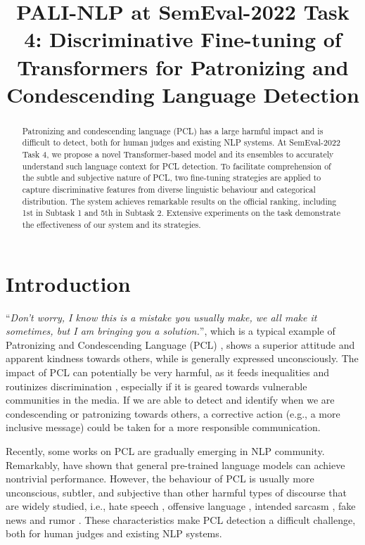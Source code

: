 \documentclass[11pt]{article}
\title{PALI-NLP at SemEval-2022 Task 4: Discriminative Fine-tuning of Transformers for Patronizing and Condescending Language Detection}
\author{Dou Hu 
\and Mengyuan Zhou 
        \and Xiyang Du
        \and Mengfei Yuan
        \\
        {\bf
        \and Meizhi Jin
        \and Lianxin Jiang
        \and Yang Mo
        \and Xiaofeng Shi
        } \\
        Ping An Life Insurance Company of China, Ltd. \\
\texttt{\{HUDOU470, ZHOUMENGYUAN425, DUXIYANG037, YUANMENGFEI854, } \\
        \texttt{JINMEIZHI005, JIANGLIANXIN769, MOYANG853, SHIXIAOFENG309\}} \\
        \texttt{@pingan.com.cn} \\
}
\begin{document}
\maketitle
\begin{abstract}
Patronizing and condescending language (PCL) has a large harmful impact and is difficult to detect, both for human judges and existing NLP systems.
At SemEval-2022 Task 4, we propose a novel Transformer-based model and its ensembles to accurately understand such language context for PCL detection.
To facilitate comprehension of the subtle and subjective nature of PCL, two fine-tuning strategies are applied to capture discriminative features from diverse linguistic behaviour and categorical distribution. 
The system achieves remarkable results on the official ranking, including 1st in Subtask 1 and 5th in Subtask 2.
Extensive experiments on the task demonstrate the effectiveness of our system and its strategies.
\end{abstract}

\section{Introduction}
“\textit{Don’t worry, I know this is a mistake you usually make, we all make it sometimes, but I am bringing you a solution.}”, which is a typical example of Patronizing and Condescending Language (PCL) \citep{giles1993patronizing,huckin2002critical}, shows a superior attitude and apparent kindness towards others, while is generally expressed unconsciously. The impact of PCL can potentially be very harmful, as it feeds inequalities and routinizes discrimination \citep{ng2007language}, especially if it is geared towards vulnerable communities in the media. 
If we are able to detect and identify when we are condescending or patronizing towards others, a corrective action (e.g., a more inclusive message) could be taken for a more responsible communication. 

Recently, some works \citep{DBLP:conf/emnlp/WangP19,DBLP:conf/acl/SapGQJSC20} on PCL are gradually emerging in NLP community.  Remarkably, \citet{perez2020don}
have shown that general pre-trained language models \citep{DBLP:conf/naacl/DevlinCLT19,DBLP:journals/corr/abs-1907-11692} can achieve nontrivial performance. However, the behaviour of PCL is usually more unconscious, subtler, and subjective than other harmful types of discourse that are widely studied, i.e., hate speech \citep{DBLP:conf/semeval/BasileBFNPPRS19}, offensive language \citep{DBLP:conf/semeval/ZampieriMNRFK19}, intended sarcasm \citep{duhjjms2022semeval}, fake news \citep{DBLP:conf/www/ZhangCLSZS21} and rumor \citep{DBLP:conf/acl/WeiHZYH20}. These characteristics make PCL detection a difficult challenge, both for human judges and existing NLP systems. 
\end{document}
